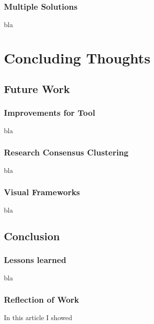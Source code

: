 \documentclass[
	a4paper,
	english,
	twoside,
	openright,               
	11pt                            
	]{report}
\begin{document}
\section{Multiple Solutions}
bla

\part{Concluding Thoughts}

\chapter{Future Work}\label{cha:futurework}

\section{Improvements for Tool}

bla

\section{Research Consensus Clustering}

bla

\section{Visual Frameworks}

bla


\chapter{Conclusion}\label{cha:conclusion}

\section{Lessons learned}
bla 

\section{Reflection of Work}
In this article I showed 
\end{document}
